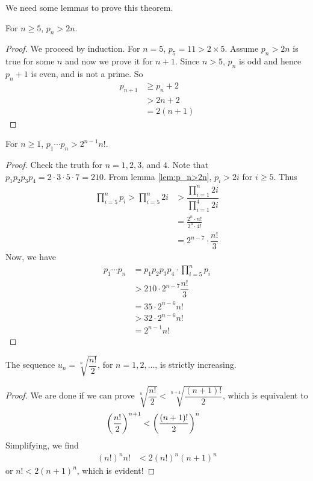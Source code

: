 We need some lemmas to prove this theorem.

\begin{lemma}
	For $n\geq 5$, $p_n>2n$.\label{lem:p_n>2n}
\end{lemma}

\begin{proof}
	We proceed by induction. For $n=5$, $p_5=11>2 \times 5$. Assume $p_n >2n$ is true for some $n$ and now we prove it for $n+1$. Since $n>5$, $p_n$ is odd and hence $p_n+1$ is even, and is not a prime. So
		\begin{align*}
			p_{n+1}
				& \geq p_n+2\\
				& >2n+2\\
				& =2(n+1)
		\end{align*}
\end{proof}

\begin{lemma}
	For $n\geq1$, $p_1\cdots p_n> 2^{n-1}n!$.\label{lem:p_1p_2...p_n>2^{n-1}n!}
\end{lemma}

\begin{proof}
	Check the truth for $n=1,2,3$, and $4$. Note that $p_1p_2p_3p_4=2\cdot3\cdot5\cdot7=210$. From lemma \eqref{lem:p_n>2n}, $p_i>2i$ for $i\geq5$. Thus
		\begin{align*}
			\prod_{i=5}^np_i > \prod_{i=5}^n2i & > \dfrac{\prod_{i=1}^n 2i}{\prod_{i=1}^4 2i}\\
								   & = \frac{2^n \cdot n!}{2^4\cdot 4!}\\
								   & = 2^{n-7}\cdot \dfrac{n!}{3}
		\end{align*}
	Now, we have
		\begin{align*}
			p_1\cdots p_n & = p_1p_2p_3p_4\cdot \prod_{i=5}^np_i \\
			   	  & > 210\cdot2^{n-7}\dfrac{n!}{3}\\
				  & = 35 \cdot2^{n-6}n!\\
				  & > 32 \cdot 2^{n-6}n!\\
				  & = 2^{n-1}n!
		\end{align*}
\end{proof}

\begin{lemma}
	The sequence $u_n=\sqrt[n]{\dfrac{n!}{2}}$, for $n=1,2,\ldots$, is strictly increasing.\label{lem:n!/2}
\end{lemma}

\begin{proof}
	We are done if we can prove $\sqrt[n]{\dfrac{n!}{2}}<\sqrt[n+1]{\dfrac{(n+1)!}{2}}$, which is equivalent to
		\begin{align*}
			\left(\dfrac{n!}{2}\right)^{n+1}
				& < \left(\dfrac{(n+1)!}{2}\right)^n
		\end{align*}
	Simplifying, we find
		\begin{align*}
		 (n!)^n n!
			 	& <  2(n!)^n(n+1)^n
		\end{align*}
	or $n!  <  2(n+1)^n$, which is evident!
\end{proof}

